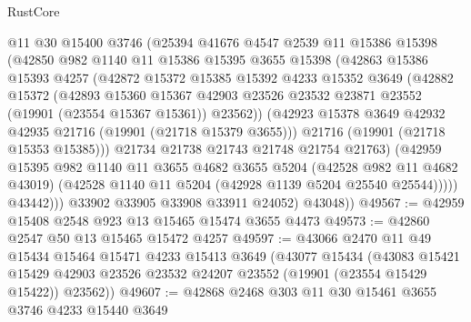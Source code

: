 \begin{lexlean}{RustCore}
\begin{coremodule}
                @11
                @30
                @15400
                @3746
                (@25394
                  @41676
                  @4547
                  @2539
                  @11
                  @15386
                  @15398
                  (@42850
                    @982
                    @1140
                    @11
                    @15386
                    @15395
                    @3655
                    @15398
                    (@42863
                      @15386
                      @15393
                      @4257
                      (@42872
                        @15372
                        @15385
                        @15392
                        @4233
                        @15352
                        @3649
                        (@42882
                          @15372
                          (@42893
                            @15360
                            @15367
                            @42903
                            @23526
                            @23532
                            @23871
                            @23552
                            (@19901 (@23554 @15367 @15361))
                            @23562))
                        (@42923 @15378 @3649 @42932 @42935 @21716 (@19901 (@21718 @15379 @3655)))
                        @21716
                        (@19901 (@21718 @15353 @15385)))
                      @21734
                      @21738
                      @21743
                      @21748
                      @21754
                      @21763)
                    (@42959
                      @15395
                      @982
                      @1140
                      @11
                      @3655
                      @4682
                      @3655
                      @5204
                      (@42528 @982 @11 @4682 @43019)
                      (@42528 @1140 @11 @5204 (@42928 @1139 @5204 @25540 @25544)))))
                @43442)))
          @33902
          @33905
          @33908
          @33911
          @24052)
        @43048))
@49567 := @42959 @15408 @2548 @923 @13 @15465 @15474 @3655 @4473
@49573 := @42860 @2547 @50 @13 @15465 @15472 @4257
@49597 := @43066
    @2470
    @11
    @49
    @15434
    @15464
    @15471
    @4233
    @15413
    @3649
    (@43077
      @15434
      (@43083
        @15421
        @15429
        @42903
        @23526
        @23532
        @24207
        @23552
        (@19901 (@23554 @15429 @15422))
        @23562))
@49607 := @42868 @2468 @303 @11 @30 @15461 @3655 @3746 @4233 @15440 @3649

\end{coremodule}
\end{lexlean}

